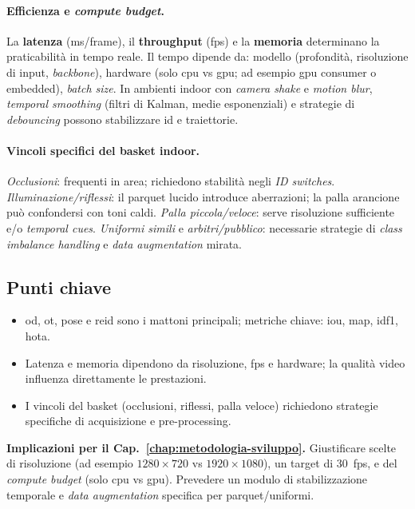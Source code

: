\documentclass[12pt,a4paper,openright,twoside]{book}
\begin{document}
\paragraph{Efficienza e \textit{compute budget}.} La \textbf{latenza} (ms/frame), il \textbf{throughput} (\ac{fps}) e la \textbf{memoria}
determinano la praticabilità in tempo reale. Il tempo dipende da: modello (profondità, risoluzione di input, \textit{backbone}), 
hardware (solo \ac{cpu} vs \ac{gpu}; ad esempio \ac{gpu} consumer o embedded), \emph{batch size}. In ambienti indoor con \emph{camera shake} e
\emph{motion blur}, \emph{temporal smoothing} (filtri di Kalman, medie esponenziali) e strategie di \emph{debouncing}
possono stabilizzare \ac{id} e traiettorie.

\paragraph{Vincoli specifici del basket indoor.} \emph{Occlusioni}: frequenti in area; richiedono stabilità negli 
\emph{ID switches}. \emph{Illuminazione/riflessi}: il parquet lucido introduce aberrazioni; la palla arancione può 
confondersi con toni caldi. \emph{Palla piccola/veloce}: serve risoluzione sufficiente e/o \emph{temporal cues}.
\emph{Uniformi simili} e \emph{arbitri/pubblico}: necessarie strategie di \emph{class imbalance handling} e \emph{data augmentation} mirata.

\subsection*{Punti chiave}
\begin{itemize}
  \item \ac{od}, \ac{ot}, pose e \ac{reid} sono i mattoni principali; metriche chiave: \ac{iou}, \ac{map}, 
        \ac{idf1}, \ac{hota}.
  \item Latenza e memoria dipendono da risoluzione, \ac{fps} e hardware; la qualità video influenza direttamente le prestazioni.
  \item I vincoli del basket (occlusioni, riflessi, palla veloce) richiedono strategie specifiche di acquisizione e pre-processing.
\end{itemize}

\textbf{Implicazioni per il Cap.~\ref{chap:metodologia-sviluppo}.}
Giustificare scelte di risoluzione (ad esempio $1280\times720$ vs $1920\times1080$), 
un target di 30~\ac{fps}, e del \textit{compute budget} (solo \ac{cpu} vs \ac{gpu}). Prevedere un modulo di stabilizzazione temporale e \emph{data 
augmentation} specifica per parquet/uniformi.
\end{document}
